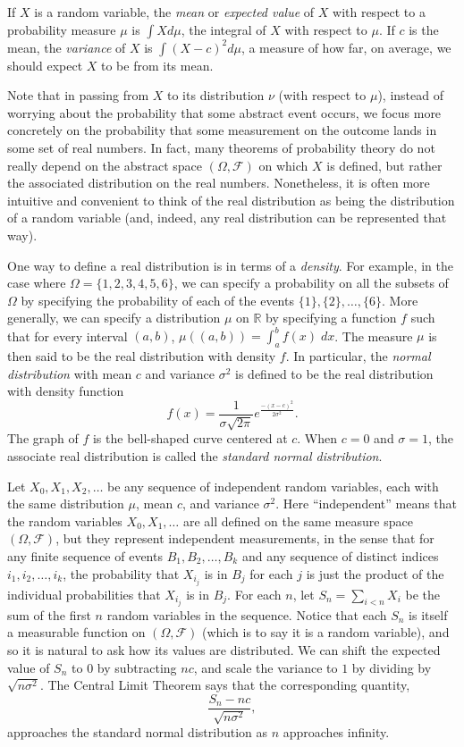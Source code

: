 \documentclass{svjour3}
\newcommand{\RR}{\mathbb{R}}
\newcommand{\mdl}[1]{{\mathcal #1}} %
\begin{document}
If $X$ is a random variable, the \emph{mean} or \emph{expected value} of $X$ with respect to a probability measure $\mu$ is $\int X d\mu$, the integral of $X$ with respect to $\mu$. If $c$ is the mean, the \emph{variance} of $X$ is $\int (X - c)^2 d\mu$, a measure of how far, on average, we should expect $X$ to be from its mean.

Note that in passing from $X$ to its distribution $\nu$ (with respect to $\mu$), instead of worrying about the probability that some abstract event occurs, we focus more concretely on the probability that some measurement on the outcome lands in some set of real numbers. In fact, many theorems of probability theory do not really depend on the abstract space $(\Omega, \mdl F)$ on which $X$ is defined, but rather the associated distribution on the real numbers. Nonetheless, it is often more intuitive and convenient to think of the real distribution as being the distribution of a random variable (and, indeed, any real distribution can be represented that way).

One way to define a real distribution is in terms of a \emph{density}. For example, in the case where $\Omega = \{1, 2, 3, 4, 5, 6\}$, we can specify a probability on all the subsets of $\Omega$ by specifying the probability of each of the events $\{1\}, \{2\}, \ldots, \{6\}$. More generally, we can specify a distribution $\mu$ on $\RR$ by specifying a function $f$ such that for every interval $(a, b)$, $\mu((a, b)) = \int_a^b f(x) \; \mathit{dx}$. The measure $\mu$ is then said to be the real distribution with density $f$. In particular, the \emph{normal distribution} with mean $c$ and variance $\sigma^2$ is defined to be the real distribution with density function
\[
f(x) = \frac{1}{\sigma \sqrt{2 \pi}} e^\frac{-(x - c)^2}{2 \sigma^2}.
\]
The graph of $f$ is the bell-shaped curve centered at $c$. When $c = 0$ and $\sigma = 1$, the associate real distribution is called the \emph{standard normal distribution}.

Let $X_0, X_1, X_2, \ldots$ be any sequence of independent random variables, each with the same distribution $\mu$, mean $c$, and variance $\sigma^2$. Here ``independent'' means that the random variables $X_0, X_1, \ldots$ are all defined on the same measure space $(\Omega, \mdl F)$, but they represent independent measurements, in the sense that for any finite sequence of events $B_1, B_2, \ldots, B_k$ and any sequence of distinct indices $i_1, i_2, \ldots, i_k$, the probability that $X_{i_j}$ is in $B_j$ for each $j$ is just the product of the individual probabilities that $X_{i_j}$ is in $B_j$. For each $n$, let $S_n = \sum_{i < n} X_i$ be the sum of the first $n$ random variables in the sequence. Notice that each $S_n$ is itself a measurable function on $(\Omega, \mdl F)$ (which is to say it is a random variable), and so it is natural to ask how its values are distributed. We can shift the expected value of $S_n$ to $0$ by subtracting $n c$, and scale the variance to $1$ by dividing by $\sqrt{ n \sigma^2}$. The Central Limit Theorem says that the corresponding quantity,
\[
 \frac{S_n - nc}{\sqrt{n \sigma^2}},
\]
approaches the standard normal distribution as $n$ approaches infinity.
\end{document}
